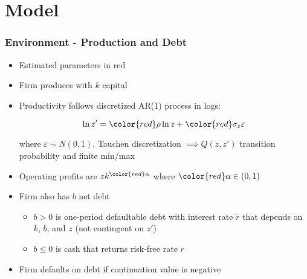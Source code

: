 \documentclass[usenames,dvipsnames, handout]{beamer}
\begin{document}
\section{Model}

\begin{frame}
\frametitle{Environment - Production and Debt}
\small
\begin{itemize}
\item Estimated parameters in {\color{red}red}
\item Firm produces with $k$ capital
\item Productivity follows discretized AR(1) process in logs: 

$$
\ln z' = {\color{red}\rho} \ln z + {\color{red}\sigma_\varepsilon} \varepsilon
$$

where $\varepsilon \sim N(0, 1)$. Tauchen discretization $\implies Q(z, z')$ transition probability and finite min/max
\item Operating profits are $z k^{\color{red}\alpha}$ where ${\color{red}\alpha} \in (0, 1)$
\item Firm also has $b$ net debt
\begin{itemize}
\item $b > 0$ is one-period defaultable debt with interest rate $\tilde r$ that depends on $k$, $b$, and $z$ (not contingent on $z'$)
\item $b \le 0$ is cash that returns risk-free rate $r$
\end{itemize}

\item Firm defaults on debt if continuation value is negative
\end{itemize}
\end{frame}
\end{document}
